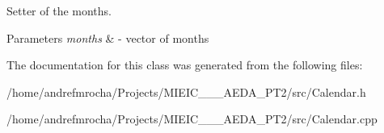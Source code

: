 Setter of the months. 


\begin{DoxyParams}{Parameters}
{\em months} & -\/ vector of months \\
\hline
\end{DoxyParams}


The documentation for this class was generated from the following files\+:\begin{DoxyCompactItemize}
\item 
/home/andrefmrocha/\+Projects/\+M\+I\+E\+I\+C\+\_\+\_\+\_\+\+A\+E\+D\+A\+\_\+\+P\+T2/src/Calendar.\+h\item 
/home/andrefmrocha/\+Projects/\+M\+I\+E\+I\+C\+\_\+\_\+\_\+\+A\+E\+D\+A\+\_\+\+P\+T2/src/Calendar.\+cpp\end{DoxyCompactItemize}

